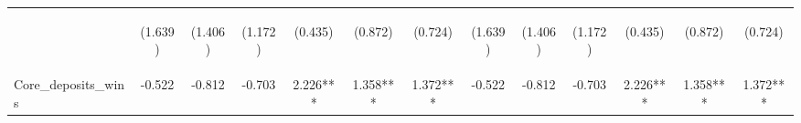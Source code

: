 \documentclass[]{article}
\begin{document}
\begin{center}
\begin{tabular}{lcccccccccccc}
\vspace{4pt} & \begin{footnotesize}(1.639)\end{footnotesize} & \begin{footnotesize}(1.406)\end{footnotesize} & \begin{footnotesize}(1.172)\end{footnotesize} & \begin{footnotesize}(0.435)\end{footnotesize} & \begin{footnotesize}(0.872)\end{footnotesize} & \begin{footnotesize}(0.724)\end{footnotesize} & \begin{footnotesize}(1.639)\end{footnotesize} & \begin{footnotesize}(1.406)\end{footnotesize} & \begin{footnotesize}(1.172)\end{footnotesize} & \begin{footnotesize}(0.435)\end{footnotesize} & \begin{footnotesize}(0.872)\end{footnotesize} & \begin{footnotesize}(0.724)\end{footnotesize} \\
Core\_deposits\_wins & -0.522 & -0.812 & -0.703 & 2.226*** & 1.358*** & 1.372*** & -0.522 & -0.812 & -0.703 & 2.226*** & 1.358*** & 1.372*** \\

\end{tabular}
\end{center}
\end{document}
